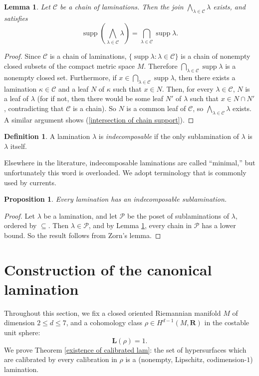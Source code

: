\documentclass[reqno,11pt]{amsart}
\newcommand{\RR}{\mathbf{R}}
\DeclareMathOperator{\supp}{supp}
\newcommand{\Comass}{\mathbf L}
\newcommand{\dfn}[1]{\emph{#1}\index{#1}}
\newtheorem{lemma}[theorem]{Lemma}
\newtheorem{proposition}[theorem]{Proposition}
\theoremstyle{definition}
\newtheorem{definition}[theorem]{Definition}
\numberwithin{equation}{section}
\begin{document}
\begin{lemma}\label{chains have lower bounds}
Let $\mathscr C$ be a chain of laminations.
Then the join $\bigwedge_{\lambda \in \mathscr C} \lambda$ exists, and satisfies 
\begin{equation}\label{intersection of chain support}
\supp \left(\bigwedge_{\lambda \in \mathscr C} \lambda\right) = \bigcap_{\lambda \in \mathscr C} \supp \lambda.
\end{equation}
\end{lemma}
\begin{proof}
Since $\mathscr C$ is a chain of laminations, $\{\supp \lambda: \lambda \in \mathscr C\}$ is a chain of nonempty closed subsets of the compact metric space $M$.
Therefore $\bigcap_{\lambda \in \mathscr C} \supp \lambda$ is a nonempty closed set.
Furthermore, if $x \in \bigcap_{\lambda \in \mathscr C} \supp \lambda$, then there exists a lamination $\kappa \in \mathscr C$ and a leaf $N$ of $\kappa$ such that $x \in N$.
Then, for every $\lambda \in \mathscr C$, $N$ is a leaf of $\lambda$ (for if not, then there would be some leaf $N'$ of $\lambda$ such that $x \in N \cap N'$, contradicting that $\mathscr C$ is a chain).
So $N$ is a common leaf of $\mathscr C$, so $\bigwedge_{\lambda \in \mathscr C} \lambda$ exists.
A similar argument shows (\ref{intersection of chain support}).
\end{proof}

\begin{definition}
A lamination $\lambda$ is \dfn{indecomposable} if the only sublamination of $\lambda$ is $\lambda$ itself.
\end{definition}

Elsewhere in the literature, indecomposable laminations are called ``minimal,'' but unfortunately this word is overloaded.
We adopt terminology that is commonly used by currents.

\begin{proposition}\label{application of Zorn}
Every lamination has an indecomposable sublamination.
\end{proposition}
\begin{proof}
Let $\lambda$ be a lamination, and let $\mathscr P$ be the poset of sublaminations of $\lambda$, ordered by $\subseteq$.
Then $\lambda \in \mathscr P$, and by Lemma \ref{chains have lower bounds}, every chain in $\mathscr P$ has a lower bound.
So the result follows from Zorn's lemma.
\end{proof}

\section{Construction of the canonical lamination}
\label{canonical sec}
Throughout this section, we fix a closed oriented Riemannian manifold $M$ of dimension $2 \leq d \leq 7$, and a cohomology class $\rho \in H^{d - 1}(M, \RR)$ in the costable unit sphere:
$$\Comass(\rho) = 1.$$
We prove Theorem \ref{existence of calibrated lam}: the set of hypersurfaces which are calibrated by every calibration in $\rho$ is a (nonempty, Lipschitz, codimension-$1$) lamination.
\end{document}
